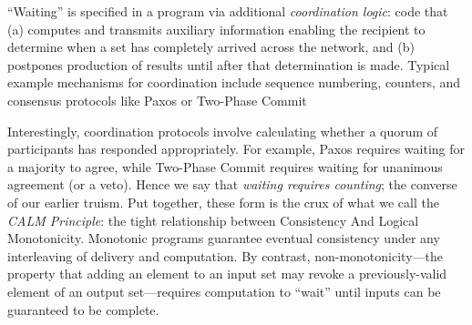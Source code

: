 ``Waiting'' is specified in a program via additional \emph{coordination logic}:  code that (a) computes and transmits auxiliary information enabling the recipient to determine when a set has completely arrived across the network, and (b) postpones production of results until after that determination is made.  Typical example mechanisms for coordination include sequence numbering, counters, and consensus protocols like Paxos or Two-Phase Commit

Interestingly, coordination protocols involve calculating whether a quorum of participants has responded appropriately.  For example, Paxos requires waiting for a majority to agree, while Two-Phase Commit requires waiting for unanimous agreement (or a veto).  Hence we say that {\em waiting requires counting}; the converse of our earlier truism.  Put together, these form is the crux of what we call the {\em CALM Principle}: the tight relationship between Consistency And Logical Monotonicity.  Monotonic programs guarantee eventual consistency under any interleaving of delivery and computation.  By contrast, non-monotonicity---the property that adding an element to an input set may revoke a previously-valid element of an output set---requires computation to ``wait'' until inputs can be guaranteed to be complete.

